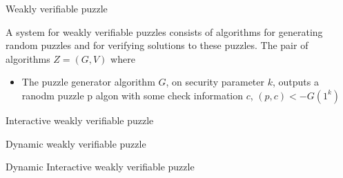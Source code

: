 \documentclass[10pt,a4paper,article,oneside]{memoir}
\begin{document}
\begin{definition} {Weakly verifiable puzzle}

A system for weakly verifiable puzzles consists of algorithms for generating random puzzles and for verifying solutions to these puzzles. The pair of algorithms $Z = (G,V)$ where
\begin{itemize}
  \item
    The puzzle generator algorithm $G$, on security parameter $k$, outputs a ranodm puzzle p algon with some check information $c$, $(p,c) <- G(1^k)$
\end{itemize}

\end{definition}


\begin{definition} {Interactive weakly verifiable puzzle}

\end{definition}


\begin{definition} {Dynamic weakly verifiable puzzle}

\end{definition}


\begin{definition} {Dynamic Interactive weakly verifiable puzzle}

\end{definition}





\end{document}
